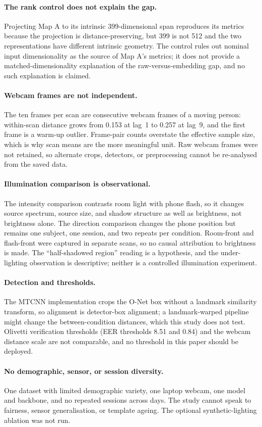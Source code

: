 \paragraph{The rank control does not explain the gap.} Projecting Map A to its intrinsic 399-dimensional span reproduces its metrics because the projection is distance-preserving, but 399 is not 512 and the two representations have different intrinsic geometry. The control rules out nominal input dimensionality as the source of Map A's metrics; it does not provide a matched-dimensionality explanation of the raw-versus-embedding gap, and no such explanation is claimed.

\paragraph{Webcam frames are not independent.} The ten frames per scan are consecutive webcam frames of a moving person: within-scan distance grows from 0.153 at lag~1 to 0.257 at lag~9, and the first frame is a warm-up outlier. Frame-pair counts overstate the effective sample size, which is why scan means are the more meaningful unit. Raw webcam frames were not retained, so alternate crops, detectors, or preprocessing cannot be re-analysed from the saved data.

\paragraph{Illumination comparison is observational.} The intensity comparison contrasts room light with phone flash, so it changes source spectrum, source size, and shadow structure as well as brightness, not brightness alone. The direction comparison changes the phone position but remains one subject, one session, and two repeats per condition. Room-front and flash-front were captured in separate scans, so no causal attribution to brightness is made. The ``half-shadowed region'' reading is a hypothesis, and the under-lighting observation is descriptive; neither is a controlled illumination experiment.

\paragraph{Detection and thresholds.} The MTCNN implementation crops the O-Net box without a landmark similarity transform, so alignment is detector-box alignment; a landmark-warped pipeline might change the between-condition distances, which this study does not test. Olivetti verification thresholds (EER thresholds 8.51 and 0.84) and the webcam distance scale are not comparable, and no threshold in this paper should be deployed.

\paragraph{No demographic, sensor, or session diversity.} One dataset with limited demographic variety, one laptop webcam, one model and backbone, and no repeated sessions across days. The study cannot speak to fairness, sensor generalisation, or template ageing. The optional synthetic-lighting ablation was not run.
